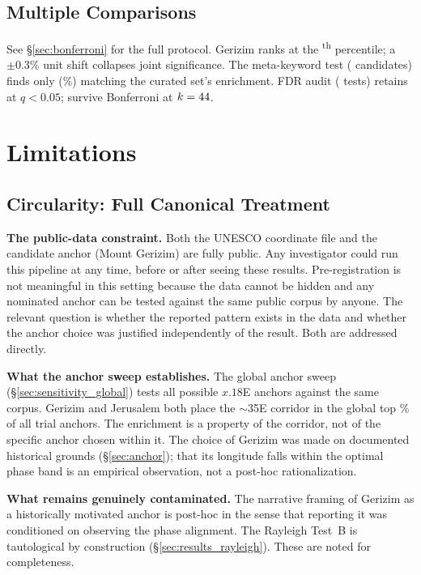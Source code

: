 \documentclass[HARVARD,twocolumn]{USG}
\begin{document}
\subsection{Multiple Comparisons}
\label{sec:sharpshooter}

See \S\ref{sec:bonferroni} for the full protocol.
Gerizim ranks at the \anchorSweepPctile{}\textsuperscript{th} percentile;
a $\pm 0.3\%$ unit shift collapses joint significance.
The meta-keyword test (\NmetaKeywords{} candidates) finds only \NmetaBeatingChi{} (\metaBeatingChiPct\%)
matching the curated set's enrichment.
FDR audit (\NtotalTests{} tests) retains \NsurviveFDR{} at $q < 0.05$;
\NsurviveBonfAll{} survive Bonferroni at $k = 44$.

\section{Limitations}
\label{sec:limitations}

\subsection{Circularity: Full Canonical Treatment}
\label{sec:limitations_circularity}

\textbf{The public-data constraint.}
Both the UNESCO coordinate file and the candidate anchor (Mount Gerizim)
are fully public. Any investigator could run this pipeline at any time,
before or after seeing these results. Pre-registration is not meaningful
in this setting because the data cannot be hidden and any nominated anchor
can be tested against the same public corpus by anyone.
The relevant question is whether the reported pattern exists in the data
and whether the anchor choice was justified independently of the result.
Both are addressed directly.

\textbf{What the anchor sweep establishes.}
The global anchor sweep (\S\ref{sec:sensitivity_global}) tests all
\NharmonicsCoarse{} possible $x.18$\textdegree{}E anchors against the same
corpus. Gerizim and Jerusalem both place the $\sim$35\textdegree{}E corridor
in the global top \anchorSweepTopPct\% of all trial anchors.
The enrichment is a property of the corridor, not of the specific anchor
chosen within it. The choice of Gerizim was made on documented historical
grounds (\S\ref{sec:anchor}); that its longitude falls within the optimal
phase band is an empirical observation, not a post-hoc rationalization.

\textbf{What remains genuinely contaminated.}
The narrative framing of Gerizim as a historically motivated anchor
is post-hoc in the sense that reporting it was conditioned on observing
the phase alignment. The Rayleigh Test~B is tautological by construction
(\S\ref{sec:results_rayleigh}). These are noted for completeness.
\end{document}
